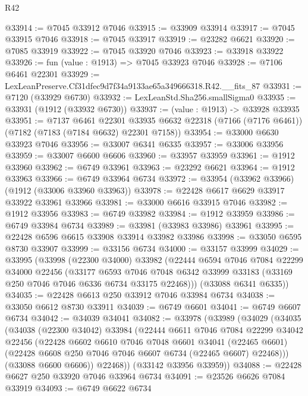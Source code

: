 \begin{lexlean}{R42}
\begin{coremodule}
{@33914 := @7045 @33912 @7046
@33915 := @33909 @33914
@33917 := @7045 @33915 @7046
@33918 := @7045 @33917
@33919 := @23282 @6621
@33920 := @7085 @33919
@33922 := @7045 @33920 @7046
@33923 := @33918 @33922
@33926 := fun (value : @1913) => @7045 @33923 @7046
@33928 := @7106 @6461 @22301
@33929 := LexLeanPreserve.Cf31dfec9d7f34a9133ae65a349666318.R42.__fits_87
@33931 := @7120 (@33929 @6730)
@33932 := LexLeanStd.Sha256.smallSigma0
@33935 := @33931 (@1912 (@33932 @6730))
@33937 := (value : @1913) -> @33928 @33935
@33951 := @7137
    @6461
    @22301
    @33935
    @6632
    @22318
    (@7166 (@7176 @6461))
    (@7182 (@7183 (@7184 @6632) @22301 @7158))
@33954 := @33000 @6630 @33923 @7046
@33956 := @33007 @6341 @6335
@33957 := @33006 @33956
@33959 := @33007 @6600 @6606
@33960 := @33957 @33959
@33961 := @1912 @33960
@33962 := @6749 @33961
@33963 := @23292 @6621
@33964 := @1912 @33963
@33966 := @6749 @33964 @6734
@33972 := @33954 (@33962 @33966) (@1912 (@33006 @33960 @33963))
@33978 := @22428 @6617 @6629 @33917 @33922 @33961 @33966
@33981 := @33000 @6616 @33915 @7046
@33982 := @1912 @33956
@33983 := @6749 @33982
@33984 := @1912 @33959
@33986 := @6749 @33984 @6734
@33989 := @33981 (@33983 @33986) @33961
@33995 := @22428 @6596 @6615 @33908 @33914 @33982 @33986
@33998 := @33050 @6595 @8730 @33907
@33999 := @33156 @6734
@34000 := @33157 @33999
@34029 := @33995
    (@33998
      (@22300 @34000)
      @33982
      (@22444
        @6594
        @7046
        @7084
        @22299
        @34000
        @22456
        (@33177
          @6593
          @7046
          @7048
          @6342
          @33999
          @33183
          (@33169 @250 @7046 @7046 @6336 @6734 @33175 @22468)))
      (@33088 @6341 @6335))
@34035 := @22428 @6613 @250 @33912 @7046 @33984 @6734
@34038 := @33050 @6612 @8730 @33911
@34039 := @6749 @6601
@34041 := @6749 @6607 @6734
@34042 := @34039 @34041
@34082 := @33978
    (@33989
      (@34029
        (@34035
          (@34038
            (@22300 @34042)
            @33984
            (@22444
              @6611
              @7046
              @7084
              @22299
              @34042
              @22456
              (@22428
                @6602
                @6610
                @7046
                @7048
                @6601
                @34041
                (@22465 @6601)
                (@22428 @6608 @250 @7046 @7046 @6607 @6734 (@22465 @6607) @22468)))
            (@33088 @6600 @6606))
          @22468))
      (@33142 @33956 @33959))
@34088 := @22428 @6627 @250 @33920 @7046 @33964 @6734
@34091 := @23526 @6626 @7084 @33919
@34093 := @6749 @6622 @6734
}
\end{coremodule}
\end{lexlean}
